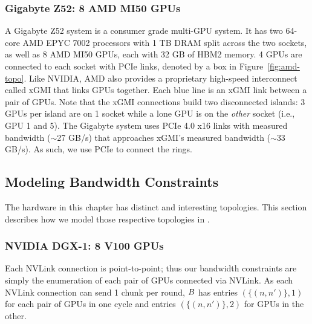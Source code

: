 \subsubsection{Gigabyte Z52: 8 AMD MI50 GPUs}
A Gigabyte Z52 system is a consumer grade multi-GPU system. It has two
64-core AMD EPYC 7002 processors with 1 TB DRAM split across the two
sockets, as well as 8 AMD MI50 GPUs, each with 32 GB of HBM2 memory. 4
GPUs are connected to each socket with PCIe links, denoted by a box in
Figure~\ref{fig:amd-topo}. Like NVIDIA, AMD also provides a
proprietary high-speed interconnect called xGMI that links GPUs
together.  Each blue line is an xGMI link between a pair of GPUs. Note
that the xGMI connections build two disconnected islands: 3 GPUs per
island are on 1 socket while a lone GPU is on the \emph{other} socket
(i.e., GPU 1 and 5). The Gigabyte system uses PCIe 4.0 x16 links with
measured bandwidth ($\sim$27 GB/s) that approaches xGMI's measured
bandwidth ($\sim$33 GB/s). As such, we use PCIe to connect the rings.

\subsection{Modeling Bandwidth Constraints}
The hardware in this chapter has distinct and interesting topologies.
This section describes how we model those respective topologies in
\tool.

\subsubsection{NVIDIA DGX-1: 8 V100 GPUs}
Each NVLink connection is point-to-point; thus our bandwidth
constraints are simply the enumeration of each pair of GPUs connected
via NVLink. As each NVLink connection can send 1 chunk per round,
$B$ has entries $(\{(n,n')\},1)$ for each pair of GPUs in one cycle
and entries $(\{(n,n')\},2)$ for GPUs in the other.

